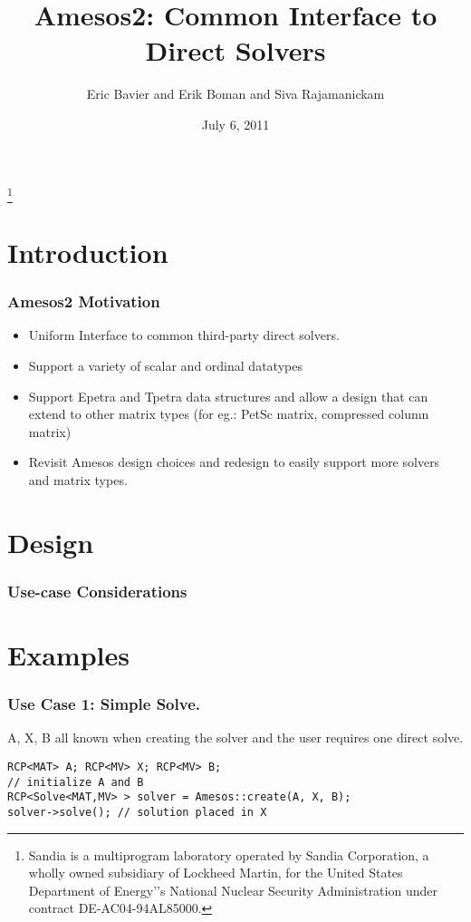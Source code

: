 \documentclass[xcolor=dvipsnames]{beamer}
\title[Amesos2]{Amesos2: Common Interface to Direct Solvers}
\author[Bavier,Boman,Rajamanickam]{Eric Bavier and Erik Boman and Siva Rajamanickam}
\institute[SNL]{
Sandia National Laboratories
}
\date[]{July 6, 2011}
\begin{document}
\begin{frame}[plain]
  \titlepage
  \footnote{\tiny{Sandia is a multiprogram laboratory operated by Sandia Corporation, a wholly owned subsidiary of Lockheed Martin, for the United States Department of Energy'’s National Nuclear Security Administration under contract DE-AC04-94AL85000.}}
\end{frame}

\section{Introduction}

\begin{frame}
  \frametitle{Amesos2 Motivation}

  \begin{itemize}
  \item Uniform Interface to common third-party direct solvers.
    \medskip
  \item Support a variety of scalar and ordinal datatypes
    \medskip
  \item Support Epetra and Tpetra data structures and allow a design that can
    extend to other matrix types (for eg.: PetSc matrix, compressed column
    matrix)
    \medskip
  \item Revisit Amesos design choices and redesign to easily support more
    solvers and matrix types.
  \end{itemize}
\end{frame}

\section{Design}

\begin{frame}
  \frametitle{Use-case Considerations}
\end{frame}

\section{Examples}

\begin{frame}[fragile]          %
  \frametitle{Use Case 1: Simple Solve.}
  A, X, B all known when creating the solver and the user requires one direct
  solve.
  \begin{lstlisting}
RCP<MAT> A; RCP<MV> X; RCP<MV> B;
// initialize A and B
RCP<Solve<MAT,MV> > solver = Amesos::create(A, X, B);
solver->solve(); // solution placed in X
  \end{lstlisting}
\end{frame}
\end{document}
